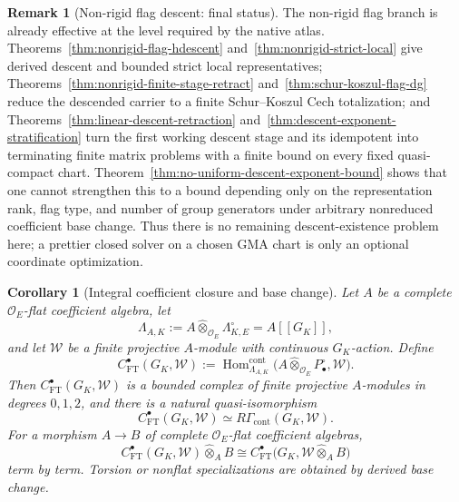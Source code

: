 \documentclass[11pt]{article}
\newtheorem{corollary}[theorem]{Corollary}
\theoremstyle{definition}
\newtheorem{remark}[theorem]{Remark}
\begin{document}
\begin{remark}[Non-rigid flag descent: final status]\label{rem:nonrigid-effective-descent-closed}
The non-rigid flag branch is already effective at the level required by the native atlas.  Theorems~\ref{thm:nonrigid-flag-hdescent} and~\ref{thm:nonrigid-strict-local} give derived descent and bounded strict local representatives; Theorems~\ref{thm:nonrigid-finite-stage-retract} and~\ref{thm:schur-koszul-flag-dg} reduce the descended carrier to a finite Schur--Koszul Cech totalization; and Theorems~\ref{thm:linear-descent-retraction} and~\ref{thm:descent-exponent-stratification} turn the first working descent stage and its idempotent into terminating finite matrix problems with a finite bound on every fixed quasi-compact chart.  Theorem~\ref{thm:no-uniform-descent-exponent-bound} shows that one cannot strengthen this to a bound depending only on the representation rank, flag type, and number of group generators under arbitrary nonreduced coefficient base change.  Thus there is no remaining descent-existence problem here; a prettier closed solver on a chosen GMA chart is only an optional coordinate optimization.
\end{remark}

\begin{corollary}[Integral coefficient closure and base change]\label{cor:integral-full-transport-coeff}
Let $A$ be a complete $\mathcal O_E$-flat coefficient algebra, let
\[
\Lambda_{A,K}:=A\widehat\otimes_{\mathcal O_E}\Lambda_{K,E}^{\circ}=A[[G_K]],
\]
and let $\mathcal W$ be a finite projective $A$-module with continuous $G_K$-action.  Define
\begin{equation}\label{eq:abstract-ft-cochain}
C_{\mathrm{FT}}^{\bullet}(G_K,\mathcal W)
:=
\operatorname{Hom}^{\mathrm{cont}}_{\Lambda_{A,K}}
\bigl(A\widehat\otimes_{\mathcal O_E}P_{\bullet}^{\circ},\mathcal W\bigr).
\end{equation}
Then $C_{\mathrm{FT}}^{\bullet}(G_K,\mathcal W)$ is a bounded complex of finite projective $A$-modules in degrees $0,1,2$, and there is a natural quasi-isomorphism
\[
C_{\mathrm{FT}}^{\bullet}(G_K,\mathcal W)
\simeq
R\Gamma_{\mathrm{cont}}(G_K,\mathcal W).
\]
For a morphism $A\to B$ of complete $\mathcal O_E$-flat coefficient algebras,
\[
C_{\mathrm{FT}}^{\bullet}(G_K,\mathcal W)
\widehat\otimes_A B
\cong
C_{\mathrm{FT}}^{\bullet}
\bigl(G_K,\mathcal W\widehat\otimes_A B\bigr)
\]
term by term.  Torsion or nonflat specializations are obtained by derived base change.
\end{corollary}
\end{document}
